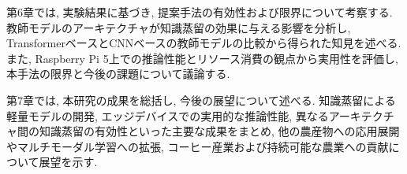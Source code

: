 第6章では, 実験結果に基づき, 提案手法の有効性および限界について考察する. 
教師モデルのアーキテクチャが知識蒸留の効果に与える影響を分析し, TransformerベースとCNNベースの教師モデルの比較から得られた知見を述べる. 
また, Raspberry Pi 5上での推論性能とリソース消費の観点から実用性を評価し, 本手法の限界と今後の課題について議論する.

第7章では, 本研究の成果を総括し, 今後の展望について述べる. 
知識蒸留による軽量モデルの開発, エッジデバイスでの実用的な推論性能, 異なるアーキテクチャ間の知識蒸留の有効性といった主要な成果をまとめ, 他の農産物への応用展開やマルチモーダル学習への拡張, コーヒー産業および持続可能な農業への貢献について展望を示す.
